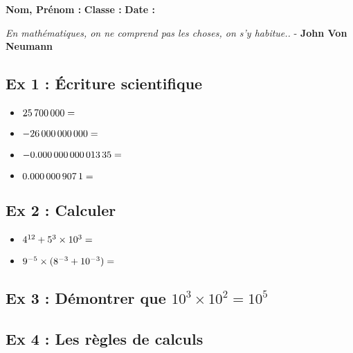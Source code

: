 



\textbf{Nom, Prénom :} \hspace{8cm} \textbf{Classe :} \hspace{3cm} \textbf{Date :}\\


\begin{center}
  \textit{En mathématiques, on ne comprend pas les choses, on s’y habitue..}  - \textbf{John Von Neumann}
\end{center}

\subsection*{Ex 1 : Écriture scientifique}

\begin{multicols}{2}
  \begin{itemize}[label={$\bullet$}]
  \item $\SI{25700000}{} = \dotfill$
  \item $\SI{-26000000000}{} = \dotfill$
  \item $\SI{-0,00000000001335}{} = \dotfill$
  \item $\SI{0,0000009071}{} = \dotfill$
  \end{itemize}
\end{multicols}

\subsection*{Ex 2 : Calculer}

\begin{multicols}{2}
  \begin{itemize}[label={$\bullet$}]
  \item $ 4^{12} + 5^3 \times 10^3 = \dotfill$
  \item $ 9^{-5} \times ( 8^{-3} + 10^{-3}) = \dotfill$
  \end{itemize}
\end{multicols}

\subsection*{Ex 3 : Démontrer que $10^3 \times 10^2 = 10^5$}

\Pointilles[4]

\subsection*{Ex 4 : Les règles de calculs}

